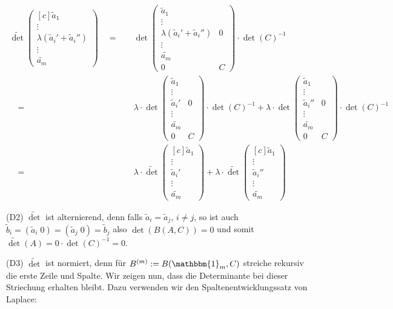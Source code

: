 \documentclass{article}
\newcommand{\eq}{\mathbb{\quad = \quad}}
\newcommand{\vect}[1]{\begin{pmatrix*}[c] #1 \end{pmatrix*}}
\newcommand{\legs}[2]{\left(\begin{array}{#1}#2\end{array}\right)}
\begin{document}
\begin{align*}
  \widetilde{\det}\vect{\tilde{a}_1 \\ \vdots \\  \lambda(\tilde{a}_i'+\tilde{a}_i'') \\ \vdots \\ \tilde{a_m}}
  \eq
   & \det\legs{cc}{\tilde{a}_1      \\ \vdots \\  \lambda(\tilde{a}_i'+\tilde{a}_i'') & 0 \\ \vdots \\ \tilde{a_m} \\ 0 & C} \cdot \det(C)^{-1} \\
  \eq
   & \lambda \cdot
  \det\legs{cc}{\tilde{a}_1         \\ \vdots \\  \tilde{a}_i' & 0 \\ \vdots \\ \tilde{a_m} \\ 0 & C}
  \cdot \det(C)^{-1}
  +
  \lambda \cdot
  \det\legs{cc}{\tilde{a}_1         \\ \vdots \\  \tilde{a}_i'' & 0 \\ \vdots \\ \tilde{a_m} \\ 0 & C}
  \cdot \det(C)^{-1}                \\
  \eq
   & \lambda \cdot
  \widetilde{\det}\vect{\tilde{a}_1 \\ \vdots \\  \tilde{a}_i' \\ \vdots \\ \tilde{a_m}}+
  \lambda \cdot
  \widetilde{\det}\vect{\tilde{a}_1 \\ \vdots \\  \tilde{a}_i'' \\ \vdots \\ \tilde{a_m}}
\end{align*}

(D2) $\widetilde{\det}$ ist alternierend, denn falls
$\tilde{a}_i = \tilde{a}_j$,
$i \neq j$,
so ist auch
$\tilde{b}_i = (\tilde{a}_i \; 0) = (\tilde{a}_j \; 0) =\tilde{b}_j$
also
$\det(B(A,C)) = 0$
und somit
$\widetilde{\det}(A) = 0 \cdot \det(C)^{-1} = 0$.

\bigbreak
(D3) $\widetilde{\det}$ ist normiert, denn für
$B^{(m)} := B(\mathbbm{1}_m, C)$
streiche rekursiv die erste Zeile und Spalte.
Wir zeigen nun,
dass die Determinante bei dieser Striechung
erhalten bleibt. Dazu verwenden wir den
Spaltenentwicklungssatz von Laplace:
\end{document}
